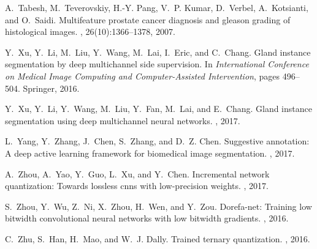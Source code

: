 \documentclass[10pt,twocolumn,letterpaper]{article}
\begin{document}
{\begin{thebibliography}{10}
A.~Tabesh, M.~Teverovskiy, H.-Y. Pang, V.~P. Kumar, D.~Verbel, A.~Kotsianti,
  and O.~Saidi.
\newblock Multifeature prostate cancer diagnosis and gleason grading of
  histological images.
, 26(10):1366--1378, 2007.

Y.~Xu, Y.~Li, M.~Liu, Y.~Wang, M.~Lai, I.~Eric, and C.~Chang.
\newblock Gland instance segmentation by deep multichannel side supervision.
\newblock In {\em International Conference on Medical Image Computing and
  Computer-Assisted Intervention}, pages 496--504. Springer, 2016.

Y.~Xu, Y.~Li, Y.~Wang, M.~Liu, Y.~Fan, M.~Lai, and E.~Chang.
\newblock Gland instance segmentation using deep multichannel neural networks.
, 2017.

L.~Yang, Y.~Zhang, J.~Chen, S.~Zhang, and D.~Z. Chen.
\newblock Suggestive annotation: A deep active learning framework for
  biomedical image segmentation.
, 2017.

A.~Zhou, A.~Yao, Y.~Guo, L.~Xu, and Y.~Chen.
\newblock Incremental network quantization: Towards lossless cnns with
  low-precision weights.
, 2017.

S.~Zhou, Y.~Wu, Z.~Ni, X.~Zhou, H.~Wen, and Y.~Zou.
\newblock Dorefa-net: Training low bitwidth convolutional neural networks with
  low bitwidth gradients.
, 2016.

C.~Zhu, S.~Han, H.~Mao, and W.~J. Dally.
\newblock Trained ternary quantization.
, 2016.

\end{thebibliography}
}
\end{document}
